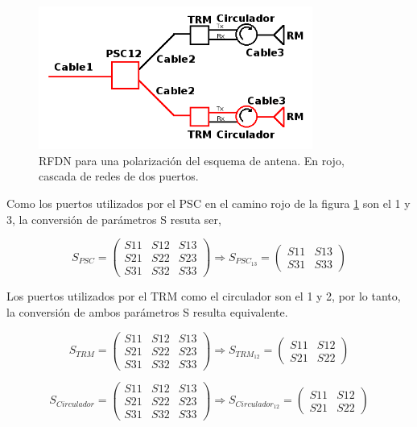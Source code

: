 \begin{figure}[H]
 \centering
 \includegraphics[width=9cm]{gfx/RFDNLoop.png}
 \caption{RFDN para una polarización del esquema de antena. En rojo, cascada de redes de dos puertos.}
 \label{fig:antennaSLoop}
\end{figure}

Como los puertos utilizados por el PSC en el camino rojo de la figura \ref{fig:antennaSLoop} son el 1 y 3, la conversión de
parámetros S resuta ser,

$$
	S_{PSC} = \begin{pmatrix} S11&S12&S13 \\ S21&S22&S23 \\ S31&S32&S33\end{pmatrix} \Rightarrow
	S_{PSC_{13}} = \begin{pmatrix} S11&S13 \\ S31&S33 \end{pmatrix}
$$

Los puertos utilizados por el TRM como el circulador son el 1 y 2, por lo tanto, la conversión de ambos parámetros S resulta
equivalente.

$$
	S_{TRM} = \begin{pmatrix} S11&S12&S13 \\ S21&S22&S23 \\ S31&S32&S33\end{pmatrix} \Rightarrow
	S_{TRM_{12}} = \begin{pmatrix} S11&S12 \\ S21&S22 \end{pmatrix}
$$

$$
	S_{Circulador} = \begin{pmatrix} S11&S12&S13 \\ S21&S22&S23 \\ S31&S32&S33\end{pmatrix} \Rightarrow
	S_{Circulador_{12}} = \begin{pmatrix} S11&S12 \\ S21&S22 \end{pmatrix}
$$

